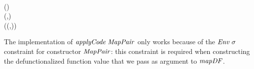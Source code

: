 \begin{hscode}\SaveRestoreHook
{}%
%
%
%
%
%
%
%
\>[B]{}\mathrel{:\mkern-1mu:}{}\<[16]%
\>[16]{}\;\;\sigma\;\tau\to {}\<[40]%
\>[40]{}\to {}\<[48]%
\>[48]{}\sigma\to {}\<[58]%
\>[58]{}\tau{}\<[E]%
\\
\>[B]{}\;{}\<[16]%
\>[16]{}\;{}\<[40]%
\>[40]{}()\;{}\<[48]%
\>[48]{}\<[55]%
\>[55]{}\mathrel{=}{}\<[55E]%
\>[58]{}\mathbin{+}\<[E]%
\\
\>[B]{}\;{}\<[16]%
\>[16]{}\;{}\<[40]%
\>[40]{}\;{}\<[48]%
\>[48]{}\<[55]%
\>[55]{}\mathrel{=}{}\<[55E]%
\>[58]{}(,){}\<[E]%
\\
\>[B]{}\;{}\<[16]%
\>[16]{}\;{}\<[40]%
\>[40]{}\;{}\<[48]%
\>[48]{}\<[55]%
\>[55]{}\mathrel{=}{}\<[55E]%
\>[58]{}\;(\;(,))\;\<[E]%
\ColumnHook
\end{hscode}\resethooks
The implementation of \ensuremath{\Varid{applyCode}\;\Conid{MapPair}} only works because of the \ensuremath{\Conid{Env}\;\sigma}
constraint for constructor \ensuremath{\Conid{MapPair}}: this constraint is required when
constructing the defunctionalized function value that we pass as argument to \ensuremath{\Varid{mapDF}}.

